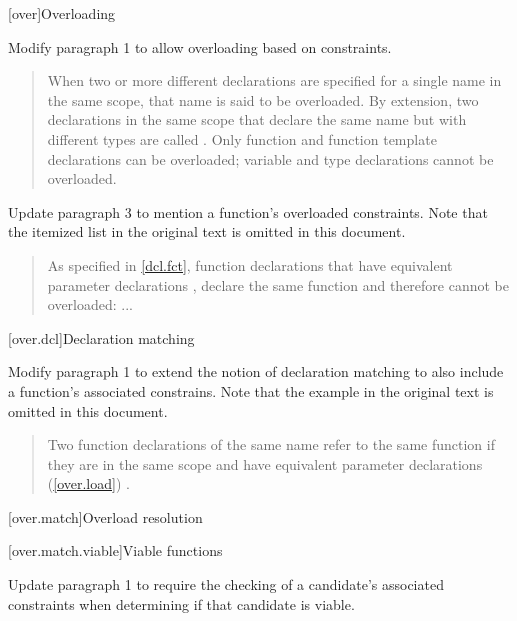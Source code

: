 
\setcounter{chapter}{12}
[over]{Overloading}

Modify paragraph 1 to allow overloading based on constraints.

\begin{quote}
\pnum
When two or more different declarations are specified for a single name 
in the same scope, that name is said to be overloaded. By extension, two 
declarations in the same scope that declare the same name but with
different types 
are called . Only function and function 
template declarations can be overloaded; variable and type declarations 
cannot be overloaded.
\end{quote}

Update paragraph 3 to mention a function's overloaded constraints. 
Note that the itemized list in the original text is omitted in this
document.

\begin{quote}
\setcounter{Paras}{2}
\pnum
\enternote
As specified in \ref{dcl.fct}, function declarations that have equivalent 
parameter declarations , declare the same function and therefore cannot be 
overloaded: ...
\exitnote
\end{quote}


[over.dcl]{Declaration matching}

Modify paragraph 1 to extend the notion of declaration matching to
also include a function's associated constrains. Note that the
example in the original text is omitted in this document.

\begin{quote}
Two function declarations of the same name refer to the same function if 
they are in the same scope and have equivalent parameter declarations 
(\ref{over.load}) .
\end{quote}


\setcounter{section}{2}
[over.match]{Overload resolution}


\setcounter{subsection}{1}
[over.match.viable]{Viable functions}

Update paragraph 1 to require the checking of a candidate's associated
constraints when determining if that candidate is viable.

